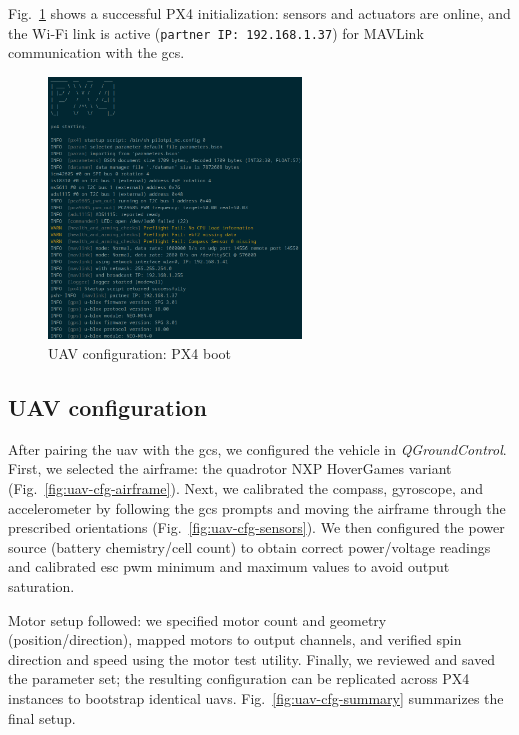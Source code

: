 Fig.~\ref{fig:uav-cfg-px4-boot} shows a successful PX4 initialization: sensors
and actuators are online, and the Wi-Fi link is active
(\lstinline{partner IP: 192.168.1.37}) for MAVLink communication with the \gls{gcs}.
  
\begin{figure}[!hbt]
  \centering
  \includegraphics[width=0.6\textwidth]{./img/png/px4-boot}
  \caption{UAV configuration: PX4 boot}
  \label{fig:uav-cfg-px4-boot}
\end{figure}

\subsection{UAV configuration}
\label{sec:uav-configuration}
After pairing the \gls{uav} with the \gls{gcs}, we configured the vehicle in \emph{QGroundControl}.
First, we selected the airframe: the quadrotor NXP HoverGames variant
(Fig.~\ref{fig:uav-cfg-airframe}). Next, we calibrated the compass,
gyroscope, and accelerometer by following the \gls{gcs} prompts and moving the
airframe through the prescribed orientations (Fig.~\ref{fig:uav-cfg-sensors}).
We then configured the power source (battery chemistry/cell count) to obtain
correct power/voltage readings and calibrated \gls{esc} \gls{pwm} minimum and
maximum values to avoid output saturation.

Motor setup followed: we specified motor count and geometry (position/direction),
mapped motors to output channels, and verified spin direction and speed using the
motor test utility. Finally, we reviewed and saved the parameter set; the
resulting configuration can be replicated across PX4 instances to bootstrap
identical \glspl{uav}. Fig.~\ref{fig:uav-cfg-summary} summarizes the final setup.

